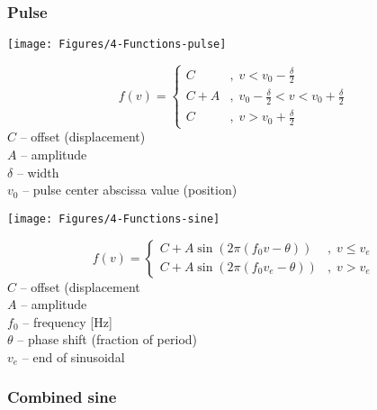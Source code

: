 \subsubsection{Pulse}

\noindent
\begin{minipage}{0.45\textwidth}
  \texttt{[image: Figures/4-Functions-pulse]}
\end{minipage}%
\begin{minipage}{0.55\textwidth}
  $$
    f(v)=\left\{\begin{array}{ll}
      C   &,\; v < v_0 - \frac{\delta}{2} \\
      C+A &,\; v_0 - \frac{\delta}{2} < v < v_0 + \frac{\delta}{2} \\
      C   &,\; v > v_0 + \frac{\delta}{2}
    \end{array}\right.
  $$
  $C$ -- offset (displacement) \\
  $A$ -- amplitude \\
  $\delta$ -- width \\
  $v_0$ -- pulse center abscissa value (position)
\end{minipage}


\noindent
\begin{minipage}{0.45\textwidth}
  \texttt{[image: Figures/4-Functions-sine]}
\end{minipage}%
\begin{minipage}{0.55\textwidth}
  $$
    f(v)=\left\{\begin{array}{ll}
      C+A\sin(2\pi(f_0v-\theta))   &,\; v \leq v_e \\
      C+A\sin(2\pi(f_0v_e-\theta)) &,\; v > v_e
    \end{array}\right.
  $$
  $C$ -- offset (displacement \\
  $A$ -- amplitude \\
  $f_0$ -- frequency [Hz] \\
  $\theta$ -- phase shift (fraction of period) \\
  $v_e$ -- end of sinusoidal
\end{minipage}


\subsubsection{Combined sine}

